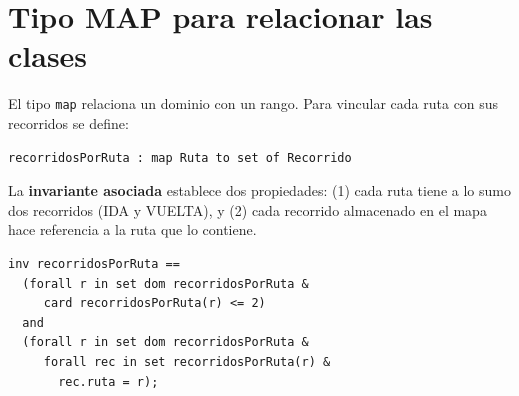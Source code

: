 \documentclass[11pt,a4paper]{article}
\begin{document}
\section{Tipo MAP para relacionar las clases}

El tipo \texttt{map} relaciona un dominio con un rango. Para vincular cada ruta con sus recorridos se define:

\begin{lstlisting}
recorridosPorRuta : map Ruta to set of Recorrido
\end{lstlisting}

La \textbf{invariante asociada} establece dos propiedades: (1) cada ruta tiene a lo sumo dos recorridos (IDA y VUELTA), y (2) cada recorrido almacenado en el mapa hace referencia a la ruta que lo contiene.

\begin{lstlisting}
inv recorridosPorRuta ==
  (forall r in set dom recorridosPorRuta &
     card recorridosPorRuta(r) <= 2)
  and
  (forall r in set dom recorridosPorRuta &
     forall rec in set recorridosPorRuta(r) &
       rec.ruta = r);
\end{lstlisting}
\end{document}
